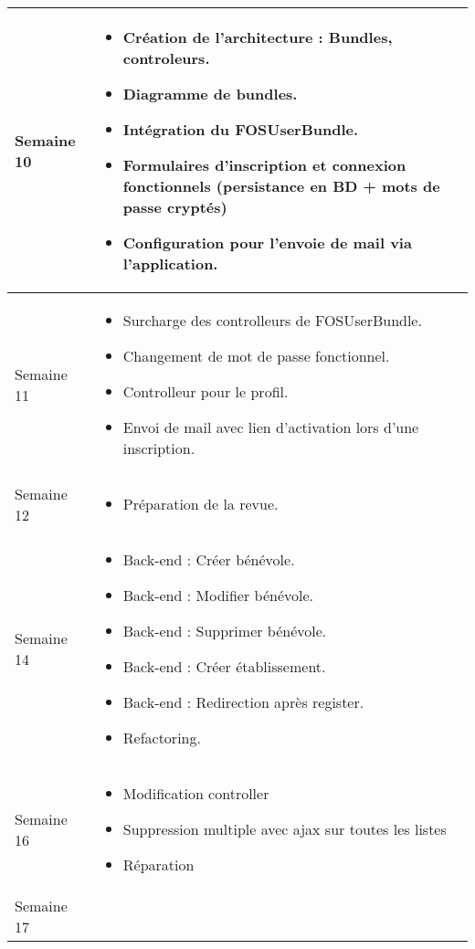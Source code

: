 \documentclass [a4paper] {article}
\begin{document}
\begin{longtable}{|>{\columncolor{gray!40}}p{2cm}|p{12cm}|}
	\hline
        Semaine 10 & \begin{itemize}
	\item Création de l'architecture : Bundles, controleurs. 
        \item Diagramme de bundles.
        \item Intégration du FOSUserBundle.
        \item Formulaires d'inscription et connexion fonctionnels (persistance en BD + mots de passe cryptés)
        \item Configuration pour l'envoie de mail via l'application.  
	\end{itemize} \\
	\hline
        Semaine 11 & \begin{itemize}
	\item Surcharge des controlleurs de FOSUserBundle. 
        \item Changement de mot de passe fonctionnel.
        \item Controlleur pour le profil.
        \item Envoi de mail avec lien d'activation lors d'une inscription.  
	\end{itemize} \\
	\hline
	Semaine 12 & \begin{itemize}
	\item Préparation de la revue.
	\end{itemize} \\
	\hline
	Semaine 14 & \begin{itemize}
	\item Back-end : Créer bénévole.
	\item Back-end : Modifier bénévole.
	\item Back-end : Supprimer bénévole.
	\item Back-end : Créer établissement.
	\item Back-end : Redirection après register.
	\item Refactoring.
	\end{itemize} \\
	\hline
	Semaine 16 & \begin{itemize}
	\item Modification controller
	\item Suppression multiple avec ajax sur toutes les listes
	\item Réparation
	\end{itemize} \\
	\hline
	Semaine 17 & \begin{itemize}

\end{itemize}
\end{longtable}
\end{document}
